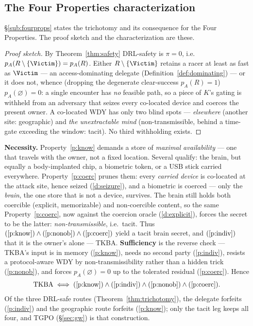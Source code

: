 \subsection{The Four Properties characterization}
\label{app:chain-fourprops}

\noindent \S\ref{sub:fourprops} states the trichotomy and its consequence for the
Four Properties. The proof sketch and the characterization are these.

\begin{proof}[Proof sketch]
By Theorem~\ref{thm:safety} DRL-safety is $\pi = 0$, i.e.\
$p_A(R\setminus\{\Victim\}) = p_A(R)$. Either $R\setminus\{\Victim\}$ retains a
racer at least as fast as $\Victim$ --- an access-dominating delegate
(Definition~\ref{def:dominating}) --- or it does not, whence (dropping the
degenerate clear-success $p_A(R)=1$) $p_A(\varnothing)=0$: a single encounter has
\emph{no} feasible path, so a piece of $K$'s gating is withheld from an adversary
that seizes every co-located device and coerces the present owner. A co-located
WDY has only two blind spots --- \emph{elsewhere} (another site: geographic) and
\emph{the unextractable mind} (non-transmissible, behind a time-gate exceeding the
window: tacit). No third withholding exists.
\end{proof}

\begin{corollary}\label{cor:fourprops}
\textbf{Necessity.} Property~\ref{p:know} demands a store of \emph{maximal
availability} --- one that travels with the owner, not a fixed location. Several
qualify: the brain, but equally a body-implanted chip, a biometric token, or a USB
stick carried everywhere. Property~\ref{p:coerc} prunes them: every \emph{carried
device} is co-located at the attack site, hence seized (\ref{d:seizure}), and a
biometric is coerced --- only the \emph{brain}, the one store that is not a device,
survives. The brain still holds both coercible (explicit, memorizable) and
non-coercible content, so the same Property~\ref{p:coerc}, now against the coercion
oracle (\ref{d:explicit}), forces the secret to be the latter:
\emph{non-transmissible}, i.e.\ tacit. Thus
$(\ref{p:know})\wedge(\ref{p:nonob})\wedge(\ref{p:coerc})$ yield a tacit brain
secret, and $(\ref{p:indiv})$ that it is the owner's alone --- TKBA.
\textbf{Sufficiency} is the reverse check --- TKBA's input is in memory
(\ref{p:know}), needs no second party (\ref{p:indiv}), resists a protocol-aware WDY
by non-transmissibility rather than a hidden trick (\ref{p:nonob}), and forces
$p_A(\varnothing) = 0$ up to the tolerated residual (\ref{p:coerc}). Hence
\[
  \text{TKBA} \;\Longleftrightarrow\; (\ref{p:know})\wedge(\ref{p:indiv})\wedge(\ref{p:nonob})\wedge(\ref{p:coerc}).
\]
Of the three DRL-safe routes (Theorem~\ref{thm:trichotomy}), the delegate forfeits
(\ref{p:indiv}) and the geographic route forfeits (\ref{p:know}); only the tacit
leg keeps all four, and TGPO (\S\ref{sec:gw}) is that construction.
\end{corollary}

